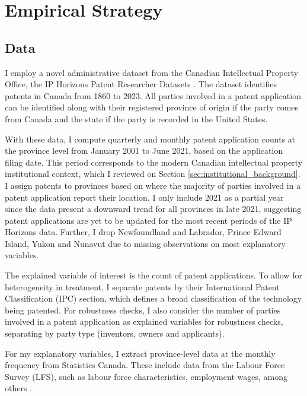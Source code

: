 \documentclass[../main.tex]{subfiles}
\begin{document}
\section{Empirical Strategy}
\label{sec:empirical_strategy}

\subsection{Data}

I employ a novel administrative dataset from the Canadian Intellectual Property Office, the IP Horizons Patent Researcher Datasets \nocite{canadianintellectualpropertyoffice23}. The dataset identifies patents in Canada from 1860 to 2023. All parties involved in a patent application can be identified along with their registered province of origin if the party comes from Canada and the state if the party is recorded in the United States.  

With these data, I compute quarterly and monthly patent application counts at the province level from January 2001 to June 2021, based on the application filing date. This period corresponds to the modern Canadian intellectual property institutional context, which I reviewed on Section \ref{sec:institutional_background}. I assign patents to provinces based on where the majority of parties involved in a patent application report their location. I only include 2021 as a partial year since the data present a downward trend for all provinces in late 2021, suggesting patent applications are yet to be updated for the most recent periods of the IP Horizons data. Further, I drop Newfoundland and Labrador, Prince Edward Island, Yukon and Nunavut due to missing observations on most explanatory variables. 

The explained variable of interest is the count of patent applications. To allow for heterogeneity in treatment, I separate patents by their International Patent Classification (IPC) section, which defines a broad classification of the technology being patented. For robustness checks, I also consider the number of parties involved in a patent application as explained variables for robustness checks, separating by party type (inventors, owners and applicants).

For my explanatory variables, I extract province-level data at the monthly frequency from Statistics Canada. These include data from the Labour Force Survey (LFS), such as labour force characteristics, employment wages, among others \nocite{lfs_lfc_table,lfs_employee_wages,statisticscanada24,statisticscanada24b}. 
\end{document}
